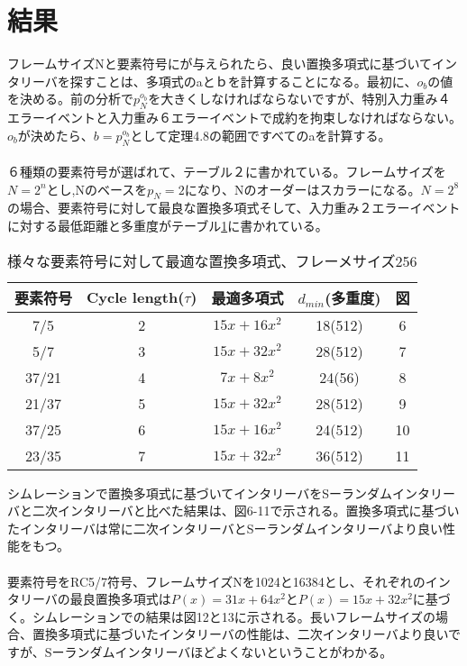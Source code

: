 \documentclass[24 pts]{article}
\begin{document}
\section{結果}
フレームサイズNと要素符号にが与えられたら、良い置換多項式に基づいてインタリーバを探すことは、多項式のaとｂを計算することになる。最初に、$o_b$の値を決める。前の分析で$p_N^{o_b}$を大きくしなければならないですが、特別入力重み４エラーイベントと入力重み６エラーイベントで成約を拘束しなければならない。$o_b$が決めたら、$b=p_N^{o_b}$として定理4.8の範囲ですべてのaを計算する。
\paragraph{}
６種類の要素符号が選ばれて、テーブル２に書かれている。フレームサイズを$N=2^n$とし,Nのベースを$p_N=2$になり、Nのオーダーはスカラーになる。$N=2^8$の場合、要素符号に対して最良な置換多項式そして、入力重み２エラーイベントに対する最低距離と多重度がテーブル\ref{テーブル:2}に書かれている。

\begin{table}[h!]
\begin{center}
\begin{tabular}{|c|c|c|c|c|}
\hline
要素符号 & Cycle length($\tau$) & 最適多項式 & $d_{min}$(多重度) & 図 \\
\hline
7/5 & 2 & $15x+16x^2$ & 18(512) & 6 \\
\hline
5/7 & 3 & $15x+32x^2$ & 28(512) & 7 \\
\hline
37/21 & 4 & $7x+8x^2$ & 24(56) & 8 \\
\hline
21/37 & 5 & $15x+32x^2$ & 28(512) & 9 \\
\hline
37/25 & 6 & $15x+16x^2$ & 24(512) & 10 \\
\hline
23/35 & 7 & $15x+32x^2$ & 36(512) & 11 \\
\hline
\end{tabular}
\caption{様々な要素符号に対して最適な置換多項式、フレーメサイズ256}
\label{テーブル:2}
\end{center}
\end{table}

シムレーションで置換多項式に基づいてインタリーバをSーランダムインタリーバと二次インタリーバと比べた結果は、図6-11で示される。置換多項式に基づいたインタリーバは常に二次インタリーバとSーランダムインタリーバより良い性能をもつ。
\paragraph{}
要素符号をRC5/7符号、フレームサイズNを1024と16384とし、それぞれのインタリーバの最良置換多項式は$P(x)=31x+64x^2$と$P(x)=15x+32x^2$に基づく。シムレーションでの結果は図12と13に示される。長いフレームサイズの場合、置換多項式に基づいたインタリーバの性能は、二次インタリーバより良いですが、Sーランダムインタリーバほどよくないということがわかる。
\end{document}
